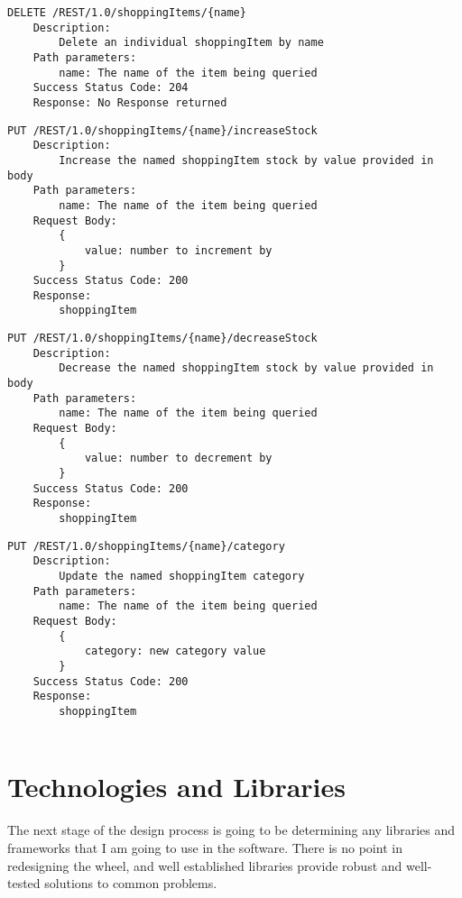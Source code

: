 \begin{verbatim}
DELETE /REST/1.0/shoppingItems/{name}
    Description:
        Delete an individual shoppingItem by name
    Path parameters:
        name: The name of the item being queried
    Success Status Code: 204
    Response: No Response returned
\end{verbatim}\medskip

\begin{verbatim}
PUT /REST/1.0/shoppingItems/{name}/increaseStock
    Description:
        Increase the named shoppingItem stock by value provided in body
    Path parameters:
        name: The name of the item being queried
    Request Body:
        {
            value: number to increment by
        }
    Success Status Code: 200
    Response:
        shoppingItem
\end{verbatim}\medskip

\begin{verbatim}
PUT /REST/1.0/shoppingItems/{name}/decreaseStock
    Description:
        Decrease the named shoppingItem stock by value provided in body
    Path parameters:
        name: The name of the item being queried
    Request Body:
        {
            value: number to decrement by
        }
    Success Status Code: 200
    Response:
        shoppingItem
\end{verbatim}\medskip


\begin{verbatim}
PUT /REST/1.0/shoppingItems/{name}/category
    Description:
        Update the named shoppingItem category
    Path parameters:
        name: The name of the item being queried
    Request Body:
        {
            category: new category value
        }
    Success Status Code: 200
    Response:
        shoppingItem
        
\end{verbatim}\medskip

\section{Technologies and Libraries}

The next stage of the design process is going to be determining any libraries and frameworks that I am going to use in the software. There is no point in redesigning the wheel, and well established libraries provide robust and well-tested solutions to common problems.

